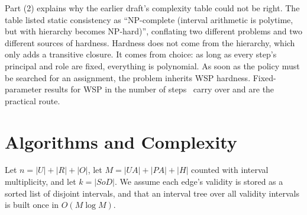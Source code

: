 \documentclass[11pt]{article}
\theoremstyle{definition}
\theoremstyle{plain}
\theoremstyle{remark}
\newcommand{\SoD}{\mathit{SoD}}
\begin{document}
Part (2) explains why the earlier draft's complexity table could not be right.
The table listed static consistency as ``NP-complete (interval arithmetic is
polytime, but with hierarchy becomes NP-hard)'', conflating two different
problems and two different sources of hardness. Hardness does not come from the
hierarchy, which only adds a transitive closure. It comes from choice: as long
as every step's principal and role are fixed, everything is polynomial. As soon
as the policy must be searched for an assignment, the problem inherits WSP
hardness. Fixed-parameter results for WSP in the number of
steps~\citep{crampton2013wspseniority} carry over and are the practical route.

\section{Algorithms and Complexity}
\label{sec:algorithms}

Let $n = |U| + |R| + |O|$, let $M = |UA| + |PA| + |H|$ counted with interval
multiplicity, and let $k = |\SoD|$. We assume each edge's validity is stored as
a sorted list of disjoint intervals, and that an interval tree over all validity
intervals is built once in $O(M \log M)$.
\end{document}
